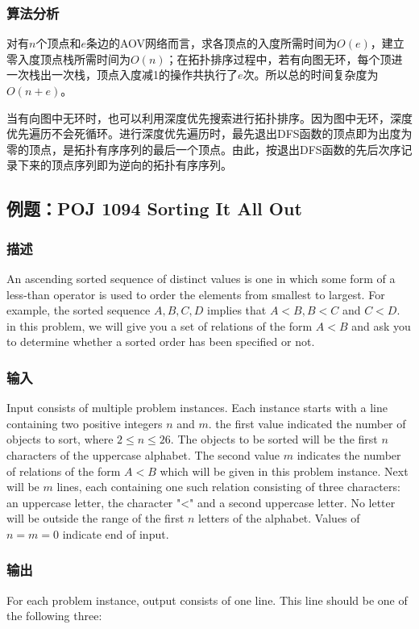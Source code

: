 \subsubsection{算法分析}
对有$n$个顶点和$e$条边的AOV网络而言，求各顶点的入度所需时间为$O(e)$，建立零入度顶点栈所需时间为$O(n)$；在拓扑排序过程中，若有向图无环，每个顶进一次栈出一次栈，顶点入度减1的操作共执行了$e$次。所以总的时间复杂度为$O(n+e)$。

当有向图中无环时，也可以利用深度优先搜索进行拓扑排序。因为图中无环，深度优先遍历不会死循环。进行深度优先遍历时，最先退出DFS函数的顶点即为出度为零的顶点，是拓扑有序序列的最后一个顶点。由此，按退出DFS函数的先后次序记录下来的顶点序列即为逆向的拓扑有序序列。


\subsection{例题：POJ 1094 Sorting It All Out}
\subsubsection{描述}
An ascending sorted sequence of distinct values is one in which some form of a less-than operator is used to order the elements from smallest to largest. For example, the sorted sequence $A, B, C, D$ implies that $A < B, B < C$ and $C < D$. in this problem, we will give you a set of relations of the form $A < B$ and ask you to determine whether a sorted order has been specified or not.

\subsubsection{输入}
Input consists of multiple problem instances. Each instance starts with a line containing two positive integers $n$ and $m$. the first value indicated the number of objects to sort, where $2 \leq n \leq 26$. The objects to be sorted will be the first $n$ characters of the uppercase alphabet. The second value $m$ indicates the number of relations of the form $A < B$ which will be given in this problem instance. Next will be $m$ lines, each containing one such relation consisting of three characters: an uppercase letter, the character "<" and a second uppercase letter. No letter will be outside the range of the first $n$ letters of the alphabet. Values of $n = m = 0$ indicate end of input.

\subsubsection{输出}
For each problem instance, output consists of one line. This line should be one of the following three: 

